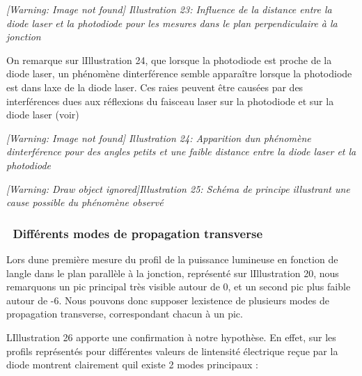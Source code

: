 \documentclass[12pt,twoside]{article}
\begin{document}
\begin{minipage}{15.334cm}
{\itshape
 [Warning: Image not found] Illustration
23\label{seq:refIllustration22}: Influence de la distance entre la
diode laser et la photodiode pour les mesures dans le plan
perpendiculaire \`a la jonction}
\end{minipage}

On remarque sur l{\textquotesingle}Illustration 24, que lorsque la
photodiode est proche de la diode laser, un ph\'enom\`ene
d{\textquotesingle}interf\'erence semble appara\^itre lorsque la
photodiode est dans l{\textquotesingle}axe de la diode laser. Ces raies
peuvent \^etre caus\'ees par des interf\'erences dues aux r\'eflexions
du faisceau laser sur la photodiode et sur la diode laser (voir)

\begin{minipage}{15.334cm}
{\itshape
 [Warning: Image not found] Illustration
24\label{seq:refIllustration23}: Apparition d{\textquotesingle}un
ph\'enom\`ene d{\textquotesingle}interf\'erence pour des angles petits
et une faible distance entre la diode laser et la photodiode}
\end{minipage}

\begin{minipage}{15.253cm}
{\itshape
[Warning: Draw object ignored]Illustration 25: Sch\'ema de principe
illustrant une cause possible du ph\'enom\`ene observ\'e}
\end{minipage}

\subsubsection[\ Diff\'erents modes de propagation
transverse]{\ Diff\'erents modes de propagation transverse}
Lors d{\textquotesingle}une premi\`ere mesure du profil de la puissance
lumineuse en fonction de l{\textquotesingle}angle dans le plan
parall\`ele \`a la jonction, repr\'esent\'e sur
l{\textquotesingle}Illustration 20, nous remarquons un pic principal
tr\`es visible autour de 0{\textdegree}, et un second pic plus faible
autour de {}-6{\textdegree}. Nous pouvons donc supposer
l{\textquotesingle}existence de plusieurs modes de propagation
transverse, correspondant chacun \`a un pic.

L{\textquotesingle}Illustration 26 apporte une confirmation \`a notre
hypoth\`ese. En effet, sur les profils repr\'esent\'es pour
diff\'erentes valeurs de l{\textquotesingle}intensit\'e \'electrique
re\c{c}ue par la diode montrent clairement qu{\textquotesingle}il
existe 2 modes principaux :
\end{document}
